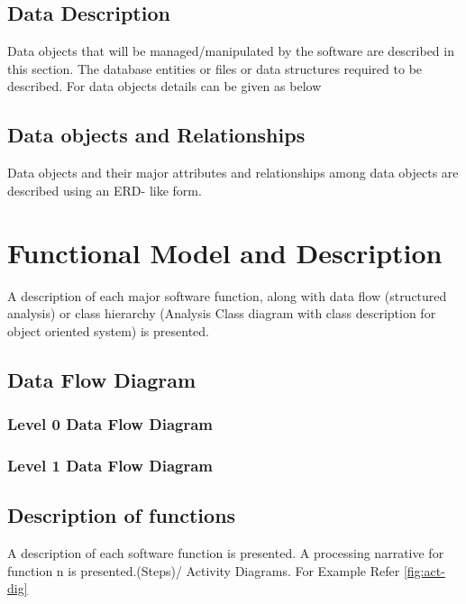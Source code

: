 \documentclass[oneside,a4paper,12pt]{report}
\begin{document}
\subsection{Data Description}
Data objects that will be managed/manipulated by the software are described in this section. The database entities or files or data structures  required to be described. For data objects details can be given as below
\subsection{Data objects and Relationships}
  Data objects and their major attributes and relationships among data objects are described using an ERD- like form.



\section{Functional Model and Description}
A description of each major software function, along with data flow (structured analysis) or class hierarchy (Analysis Class diagram with class description for object oriented system) is presented.
\subsection{Data Flow Diagram}
\subsubsection{Level 0 Data Flow Diagram}
\subsubsection{Level 1 Data Flow Diagram}

\subsection{Description of functions}
A description of each software function is presented. A processing narrative for function n is presented.(Steps)/ Activity Diagrams. For Example Refer \ref{fig:act-dig}
\end{document}
